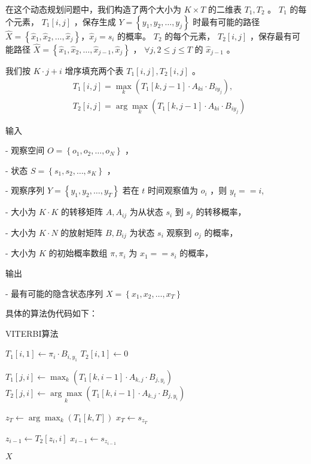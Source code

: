 \documentclass[UTF8,12pt]{ctexart}
\numberwithin{equation}{section}%
\begin{document}
	在这个动态规划问题中，我们构造了两个大小为 $K \times T$ 的二维表 $T_1, T_2$ 。 $T_1$ 的每个元素， $T_1[i, j]$ ，保存生成 $Y=\left\{y_1, y_2, \ldots, y_j\right\}$ 时最有可能的路径 $\hat{X}=\left\{\hat{x}_1, \hat{x}_2, \ldots, \hat{x}_j\right\} ， \hat{x}_j=s_i$ 的概率。 $T_2$ 的每个元素， $T_2[i, j]$ ，保存最有可能路径 $\hat{X}=\left\{\hat{x}_1, \hat{x}_2, \ldots, \hat{x}_{j-1}, \hat{x}_j\right\}$ ， $\forall j, 2 \leq j \leq T$ 的 $\hat{x}_{j-1}$ 。
	
	我们按 $K \cdot j+i$ 增序填充两个表 $T_1[i, j], T_2[i, j]$ 。
	$$
	\begin{aligned}
		& T_1[i, j]=\max _k\left(T_1[k, j-1] \cdot A_{k i} \cdot B_{i y_j}\right), \\
		& T_2[i, j]=\arg \max _k\left(T_1[k, j-1] \cdot A_{k i} \cdot B_{i y_j}\right)
	\end{aligned}
	$$
	
	输入
	
	- 观察空间 $O=\left\{o_1, o_2, \ldots, o_N\right\}$ ，
	
	- 状态 $S=\left\{s_1, s_2, \ldots, s_K\right\}$ ，
	
	- 观察序列 $Y=\left\{y_1, y_2, \ldots, y_T\right\}$ 若在 $t$ 时间观察值为 $o_i$ ，则 $y_t==i$,
	
	- 大小为 $K \cdot K$ 的转移矩阵 $A, A_{i j}$ 为从状态 $s_i$ 到 $s_j$ 的转移概率，
	
	- 大小为 $K \cdot N$ 的放射矩阵 $B, B_{i j}$ 为状态 $s_i$ 观察到 $o_j$ 的概率，
	
	- 大小为 $K$ 的初始概率数组 $\pi, \pi_i$ 为 $x_1==s_i$ 的概率，
	
	输出
	
	- 最有可能的隐含状态序列 $X=\left\{x_1, x_2, \ldots, x_T\right\}$
	
	
	具体的算法伪代码如下：
	\begin{algorithm}[H]
		\caption{VITERBI算法}
		\begin{algorithmic}[1]
			\State $T_1[i, 1] \gets \pi_i \cdot B_{i, y_1}$
			\State $T_2[i, 1] \gets 0$
			\EndFor
			
			\State $T_1[j, i] \gets \max_k\left(T_1[k, i-1] \cdot A_{k, j} \cdot B_{j, y_i}\right)$
			\State $T_2[j, i] \gets \underset{k}{\arg \max}\left(T_1[k, i-1] \cdot A_{k, j} \cdot B_{j, y_i}\right)$
			\EndFor
			\EndFor
			
			\State $z_T \gets \arg \max_k\left(T_1[k, T]\right)$
			\State $x_T \gets s_{z_T}$
			
			\State $z_{i-1} \gets T_2[z_i, i]$
			\State $x_{i-1} \gets s_{z_{i-1}}$
			\EndFor
			
			\State \Return $X$
			\EndFunction
		\end{algorithmic}
	\end{algorithm}
	
\end{document}
